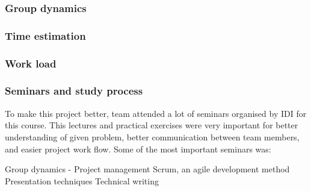 	\subsubsection{Group dynamics}
	\subsubsection{Time estimation}
	\subsubsection{Work load}
	\subsubsection{Seminars and study process}
	To make this project better, team attended a lot of seminars organised by IDI for this course. This lectures and practical exercises were very important for better understanding of given problem, better communication between team members, and easier project work flow. Some of the most important seminars was:
	
	Group dynamics - \newline
	Project management\newline
	Scrum, an agile development method\newline
	Presentation techniques\newline
	Technical writing\newline


